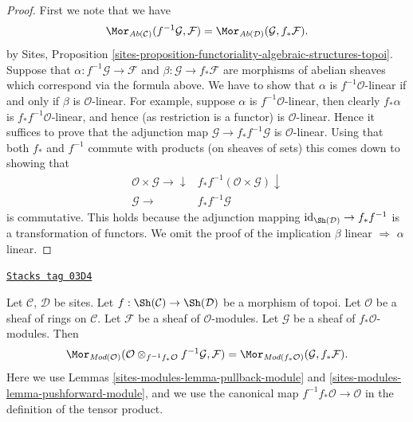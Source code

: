 \begin{proof}
First we note that we have
$$
\Mor_{\textit{Ab}(\mathcal{C})}(f^{-1}\mathcal{G}, \mathcal{F})
=
\Mor_{\textit{Ab}(\mathcal{D})}(\mathcal{G}, f_*\mathcal{F}).
$$
by Sites,
Proposition \ref{sites-proposition-functoriality-algebraic-structures-topoi}.
Suppose that $\alpha : f^{-1}\mathcal{G} \to \mathcal{F}$ and
$\beta : \mathcal{G} \to f_*\mathcal{F}$ are morphisms of abelian
sheaves which correspond via the formula above. We have to show that
$\alpha$ is $f^{-1}\mathcal{O}$-linear if and only if $\beta$
is $\mathcal{O}$-linear. For example, suppose $\alpha$ is
$f^{-1}\mathcal{O}$-linear, then clearly $f_*\alpha$ is
$f_*f^{-1}\mathcal{O}$-linear, and hence (as restriction is a functor)
is $\mathcal{O}$-linear. Hence it suffices to prove that the
adjunction map $\mathcal{G} \to f_*f^{-1}\mathcal{G}$ is
$\mathcal{O}$-linear. Using that both $f_*$ and $f^{-1}$ commute
with products (on sheaves of sets) this comes down to showing that
$$
\begin{array}{cc}\mathcal{O} \times \mathcal{G} \longrightarrow\downarrow & f_*f^{-1}(\mathcal{O} \times \mathcal{G}) \downarrow \\ \mathcal{G} \longrightarrow & f_*f^{-1}\mathcal{G}\end{array}
$$
is commutative. This holds because the adjunction mapping
$\text{id}_{\Sh(\mathcal{D})} \to f_*f^{-1}$ is a
transformation of functors. We omit the proof of the implication
$\beta$ linear $\Rightarrow$ $\alpha$ linear.
\end{proof}

\begin{lemma}
\label{sites-modules-lemma-adjoint-pull-push-modules}
\href{https://stacks.math.columbia.edu/tag/03D4}{\texttt{Stacks tag 03D4}}

Let $\mathcal{C}$, $\mathcal{D}$ be sites.
Let $f : \Sh(\mathcal{C}) \to \Sh(\mathcal{D})$
be a morphism of topoi.
Let $\mathcal{O}$ be a sheaf of rings on $\mathcal{C}$.
Let $\mathcal{F}$ be a sheaf of $\mathcal{O}$-modules.
Let $\mathcal{G}$ be a sheaf of $f_*\mathcal{O}$-modules.
Then
$$
\Mor_{\textit{Mod}(\mathcal{O})}(
\mathcal{O} \otimes_{f^{-1}f_*\mathcal{O}} f^{-1}\mathcal{G}, \mathcal{F})
=
\Mor_{\textit{Mod}(f_*\mathcal{O})}(\mathcal{G}, f_*\mathcal{F}).
$$
Here we use
Lemmas \ref{sites-modules-lemma-pullback-module}
and \ref{sites-modules-lemma-pushforward-module}, and we use
the canonical map $f^{-1}f_*\mathcal{O} \to \mathcal{O}$
in the definition of the tensor product.
\end{lemma}

